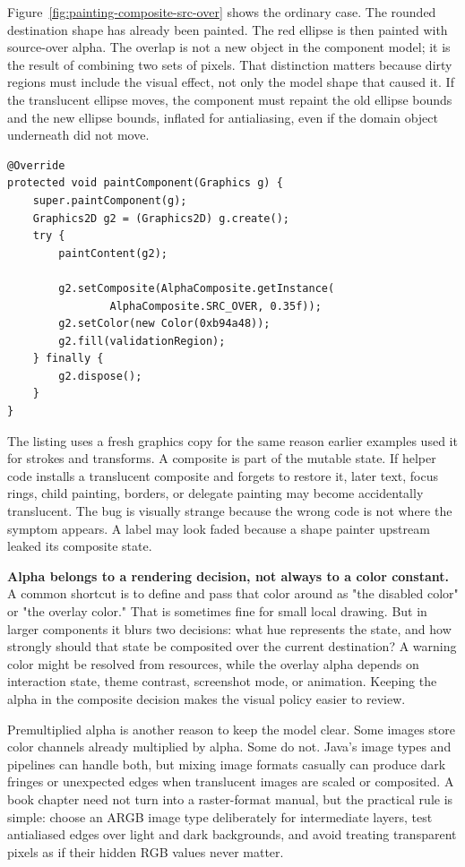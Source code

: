 Figure~\ref{fig:painting-composite-src-over} shows the ordinary case. The rounded destination shape has already been painted. The red ellipse is then painted with source-over alpha. The overlap is not a new object in the component model; it is the result of combining two sets of pixels. That distinction matters because dirty regions must include the visual effect, not only the model shape that caused it. If the translucent ellipse moves, the component must repaint the old ellipse bounds and the new ellipse bounds, inflated for antialiasing, even if the domain object underneath did not move.

\begin{lstlisting}[caption={Temporarily installing a translucent source-over composite.}]
@Override
protected void paintComponent(Graphics g) {
    super.paintComponent(g);
    Graphics2D g2 = (Graphics2D) g.create();
    try {
        paintContent(g2);

        g2.setComposite(AlphaComposite.getInstance(
                AlphaComposite.SRC_OVER, 0.35f));
        g2.setColor(new Color(0xb94a48));
        g2.fill(validationRegion);
    } finally {
        g2.dispose();
    }
}
\end{lstlisting}

The listing uses a fresh graphics copy for the same reason earlier examples used it for strokes and transforms. A composite is part of the mutable  state. If helper code installs a translucent composite and forgets to restore it, later text, focus rings, child painting, borders, or delegate painting may become accidentally translucent. The bug is visually strange because the wrong code is not where the symptom appears. A label may look faded because a shape painter upstream leaked its composite state.

\textbf{Alpha belongs to a rendering decision, not always to a color constant.} A common shortcut is to define  and pass that color around as "the disabled color" or "the overlay color." That is sometimes fine for small local drawing. But in larger components it blurs two decisions: what hue represents the state, and how strongly should that state be composited over the current destination? A warning color might be resolved from resources, while the overlay alpha depends on interaction state, theme contrast, screenshot mode, or animation. Keeping the alpha in the composite decision makes the visual policy easier to review.

Premultiplied alpha is another reason to keep the model clear. Some images store color channels already multiplied by alpha. Some do not. Java's image types and pipelines can handle both, but mixing image formats casually can produce dark fringes or unexpected edges when translucent images are scaled or composited. A book chapter need not turn into a raster-format manual, but the practical rule is simple: choose an ARGB image type deliberately for intermediate layers, test antialiased edges over light and dark backgrounds, and avoid treating transparent pixels as if their hidden RGB values never matter.

